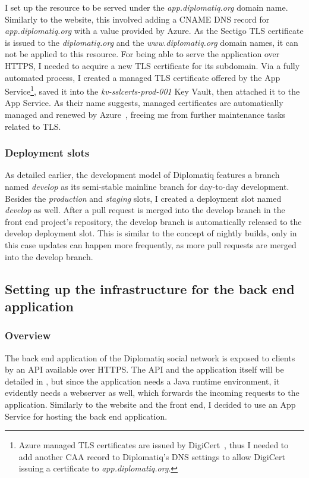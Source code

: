 I set up the resource to be served under the \emph{app.diplomatiq.org} domain name. Similarly to the website, this involved adding a CNAME DNS record for \emph{app.diplomatiq.org} with a value provided by Azure. As the Sectigo TLS certificate is issued to the \emph{diplomatiq.org} and the \emph{www.diplomatiq.org} domain names, it can not be applied to this resource. For being able to serve the application over HTTPS, I needed to acquire a new TLS certificate for its subdomain. Via a fully automated process, I created a managed TLS certificate offered by the App Service\footnote{Azure managed TLS certificates are issued by DigiCert~\cite{digicert-website}, thus I needed to add another CAA record to Diplomatiq's DNS settings to allow DigiCert issuing a certificate to \emph{app.diplomatiq.org}.}, saved it into the \emph{kv-sslcerts-prod-001} Key Vault, then attached it to the App Service. As their name suggests, managed certificates are automatically managed and renewed by Azure~\cite{managed-certificates}, freeing me from further maintenance tasks related to TLS.

\subsubsection{Deployment slots}

As detailed earlier, the development model of Diplomatiq features a branch named \emph{develop} as its semi-stable mainline branch for day-to-day development. Besides the \emph{production} and \emph{staging} slots, I created a deployment slot named \emph{develop} as well. After a pull request is merged into the develop branch in the front end project's repository, the develop branch is automatically released to the develop deployment slot. This is similar to the concept of nightly builds, only in this case updates can happen more frequently, as more pull requests are merged into the develop branch.

\subsection{Setting up the infrastructure for the back end application}

\subsubsection{Overview}

The back end application of the Diplomatiq social network is exposed to clients by an API available over HTTPS. The API and the application itself will be detailed in , but since the application needs a Java runtime environment, it evidently needs a webserver as well, which forwards the incoming requests to the application. Similarly to the website and the front end, I decided to use an App Service for hosting the back end application.

